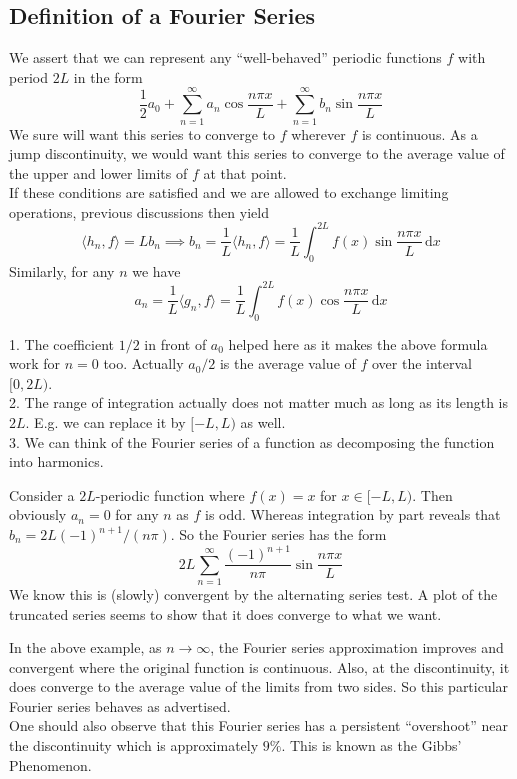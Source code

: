 \subsection{Definition of a Fourier Series}
We assert that we can represent any ``well-behaved'' periodic functions $f$ with period $2L$ in the form
$$\frac{1}{2}a_0+\sum_{n=1}^\infty a_n\cos\frac{n\pi x}{L}+\sum_{n=1}^\infty b_n\sin\frac{n\pi x}{L}$$
We sure will want this series to converge to $f$ wherever $f$ is continuous.
As a jump discontinuity, we would want this series to converge to the average value of the upper and lower limits of $f$ at that point.\\
If these conditions are satisfied and we are allowed to exchange limiting operations, previous discussions then yield
$$\langle h_n,f\rangle=Lb_n\implies b_n=\frac{1}{L}\langle h_n,f\rangle=\frac{1}{L}\int_0^{2L}f(x)\sin\frac{n\pi x}{L}\,\mathrm dx$$
Similarly, for any $n$ we have
$$a_n=\frac{1}{L}\langle g_n,f\rangle=\frac{1}{L}\int_0^{2L}f(x)\cos\frac{n\pi x}{L}\,\mathrm dx$$
\begin{note}
    1. The coefficient $1/2$ in front of $a_0$ helped here as it makes the above formula work for $n=0$ too.
    Actually $a_0/2$ is the average value of $f$ over the interval $[0,2L)$.\\
    2. The range of integration actually does not matter much as long as its length is $2L$.
    E.g. we can replace it by $[-L,L)$ as well.\\
    3. We can think of the Fourier series of a function as decomposing the function into harmonics.
\end{note}
\begin{example}
    Consider a $2L$-periodic function where $f(x)=x$ for $x\in [-L,L)$.
    Then obviously $a_n=0$ for any $n$ as $f$ is odd.
    Whereas integration by part reveals that $b_n=2L(-1)^{n+1}/(n\pi)$.
    So the Fourier series has the form
    $$2L\sum_{n=1}^\infty\frac{(-1)^{n+1}}{n\pi}\sin\frac{n\pi x}{L}$$
    We know this is (slowly) convergent by the alternating series test.
    A plot of the truncated series seems to show that it does converge to what we want.
\end{example}
\begin{note}
    In the above example, as $n\to\infty$, the Fourier series approximation improves and convergent where the original function is continuous.
    Also, at the discontinuity, it does converge to the average value of the limits from two sides.
    So this particular Fourier series behaves as advertised.\\
    One should also observe that this Fourier series has a persistent ``overshoot'' near the discontinuity which is approximately $9\%$.
    This is known as the Gibbs' Phenomenon.
\end{note}

